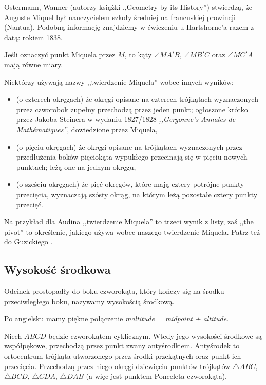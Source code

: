 Ostermann, Wanner (autorzy książki ,,Geometry by its History'') stwierdzą, że Auguste Miquel był nauczycielem szkoły średniej na francuskiej prowincji (Nantua).
Podobną informację znajdziemy w ćwiczeniu u Hartshorne'a \cite[s. 61]{hartshorne2000} razem z datą: rokiem 1838.

\begin{proposition}
	Jeśli oznaczyć punkt Miquela przez $M$, to kąty $\angle MA'B$, $\angle MB'C$ oraz $\angle MC'A$ mają równe miary.	
\end{proposition}

Niektórzy używają nazwy ,,twierdzenie Miquela'' wobec innych wyników:
\begin{itemize}
	\item (o czterech okręgach) że okręgi opisane na czterech trójkątach wyznaczonych przez czworobok zupełny przechodzą przez jeden punkt; ogłoszone krótko przez Jakoba Steinera w wydaniu 1827/1828 \emph{,,Gergonne's Annales de Mathématiques''}, dowiedzione przez Miquela,
	\item (o pięciu okręgach) że okręgi opisane na trójkątach wyznaczonych przez przedłużenia boków pięciokąta wypukłego przecinają się w pięciu nowych punktach; leżą one na jednym okręgu, %
	\item (o sześciu okręgach) że pięć okręgów, które mają cztery potrójne punkty przecięcia, wyznaczają szósty okrąg, na którym leżą pozostałe cztery punkty przecięć.
\end{itemize}

Na przykład dla Audina \cite[s. 104]{audin_2003} ,,twierdzenie Miquela'' to trzeci wynik z listy, zaś ,,the pivot'' to określenie, jakiego używa wobec naszego twierdzenie Miquela.
Patrz też do Guzickiego \cite[s. 29, 32]{guzicki_2021}.
%

\subsection{Wysokość środkowa}
\begin{definition}
	Odcinek prostopadły do boku czworokąta, który kończy się na środku przeciwległego boku, nazywamy wysokością środkową.
\end{definition}

Po angielsku mamy piękne połączenie \emph{maltitude = midpoint + altitude}.

\begin{proposition} %
	Niech $ABCD$ będzie czworokątem cyklicznym.
	Wtedy jego wysokości środkowe są współpękowe, przechodzą przez punkt zwany antyśrodkiem.
%
	Antyśrodek to ortocentrum trójkąta utworzonego przez środki przekątnych oraz punkt ich przecięcia.
	Przechodzą przez niego okręgi dziewięciu punktów trójkątów $\triangle ABC$, $\triangle BCD$, $\triangle CDA$, $\triangle DAB$ (a więc jest punktem Ponceleta czworokąta).
\end{proposition}
